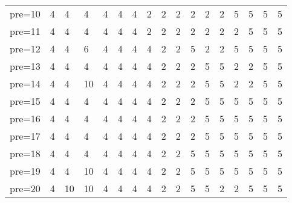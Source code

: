 \documentclass[11pt]{article}
\begin{document}
\begin{tabular}{lllllllllllllllll}
	 pre=10      & 4           & 4           & 4           & 4           & 4           & 4           & 2           & 2           & 2           & 2           & 2           & 2           & 5           & 5           & 5           & 5          \\
	 pre=11      & 4           & 4           & 4           & 4           & 4           & 4           & 2           & 2           & 2           & 2           & 2           & 2           & 2           & 5           & 5           & 5          \\
	 pre=12      & 4           & 4           & 6           & 4           & 4           & 4           & 4           & 2           & 2           & 5           & 2           & 2           & 5           & 5           & 5           & 5          \\
	 pre=13      & 4           & 4           & 4           & 4           & 4           & 4           & 4           & 2           & 2           & 2           & 5           & 5           & 2           & 2           & 5           & 5          \\
	 pre=14      & 4           & 4           & 10          & 4           & 4           & 4           & 4           & 2           & 2           & 2           & 5           & 5           & 2           & 2           & 5           & 5          \\
	 pre=15      & 4           & 4           & 4           & 4           & 4           & 4           & 4           & 2           & 2           & 2           & 5           & 5           & 5           & 5           & 5           & 5          \\
	 pre=16      & 4           & 4           & 4           & 4           & 4           & 4           & 4           & 2           & 2           & 2           & 5           & 5           & 5           & 5           & 5           & 5          \\
	 pre=17      & 4           & 4           & 4           & 4           & 4           & 4           & 4           & 2           & 2           & 2           & 5           & 5           & 5           & 5           & 5           & 5          \\
	 pre=18      & 4           & 4           & 4           & 4           & 4           & 4           & 4           & 2           & 2           & 5           & 5           & 5           & 5           & 5           & 5           & 5          \\
	 pre=19      & 4           & 4           & 10          & 4           & 4           & 4           & 4           & 2           & 2           & 5           & 5           & 5           & 5           & 5           & 5           & 5          \\
	 pre=20      & 4           & 10          & 10          & 4           & 4           & 4           & 4           & 2           & 2           & 5           & 5           & 2           & 2           & 5           & 5           & 5          \\
\end{tabular}
\end{document}
